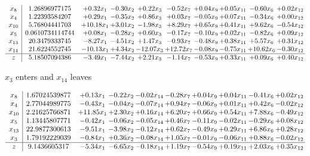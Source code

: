 \documentclass[9pt]{article}
\begin{document}
 \[\begin{array}{c| c c@{\hskip 2pt} c@{\hskip 2pt} c@{\hskip 2pt} c@{\hskip 2pt} c@{\hskip 2pt} c@{\hskip 2pt} c@{\hskip 2pt} c@{\hskip 2pt} }
 x_{8}   &  1.26896977175 & +  0.32 x_{1} & -0.30 x_{2} & +  0.22 x_{3} & -0.52 x_{7} & +  0.04 x_{9} & +  0.05 x_{11} & -0.60 x_{6} & +  0.02 x_{12}\\
 x_{4}   &  1.22393584207 & +  0.29 x_{1} & -0.35 x_{2} & +  0.86 x_{3} & +  0.03 x_{7} & -0.05 x_{9} & +  0.07 x_{11} & -0.34 x_{6} & +  0.00 x_{12}\\
 x_{10}   &  5.76804441703 & + 10.18 x_{1} & +  3.01 x_{2} & -1.98 x_{3} & +  8.29 x_{7} & +  0.65 x_{9} & +  0.41 x_{11} & +  9.62 x_{6} & -0.54 x_{12}\\
 x_{5}   &  0.0610734114744 & +  0.08 x_{1} & -0.28 x_{2} & +  0.60 x_{3} & -0.17 x_{7} & -0.10 x_{9} & +  0.02 x_{11} & -0.82 x_{6} & +  0.09 x_{12}\\
 x_{13}   &  20.3479333745 & -8.27 x_{1} & -4.51 x_{2} & +  1.47 x_{3} & -0.93 x_{7} & -0.48 x_{9} & +  0.38 x_{11} & +  5.57 x_{6} & +  0.31 x_{12}\\
 x_{14}   &  21.6224552745 & -10.13 x_{1} & +  4.34 x_{2} & -12.07 x_{3} & + 12.72 x_{7} & -0.08 x_{9} & -0.75 x_{11} & + 10.62 x_{6} & -0.30 x_{12}\\
\hline
z    &  5.18507094386 & -3.49 x_{1} & -7.44 x_{2} & +  2.21 x_{3} & -1.14 x_{7} & -0.53 x_{9} & +  0.33 x_{11} & +  0.09 x_{6} & +  0.40 x_{12}\\
\end{array}\]


 $ x_{3} $ enters and $ x_{14} $ leaves 

 \[\begin{array}{c| c c@{\hskip 2pt} c@{\hskip 2pt} c@{\hskip 2pt} c@{\hskip 2pt} c@{\hskip 2pt} c@{\hskip 2pt} c@{\hskip 2pt} c@{\hskip 2pt} }
 x_{8}   &  1.67024539877 & +  0.13 x_{1} & -0.22 x_{2} & -0.02 x_{14} & -0.28 x_{7} & +  0.04 x_{9} & +  0.04 x_{11} & -0.41 x_{6} & +  0.02 x_{12}\\
 x_{4}   &  2.77044989775 & -0.43 x_{1} & -0.04 x_{2} & -0.07 x_{14} & +  0.94 x_{7} & -0.06 x_{9} & +  0.01 x_{11} & +  0.42 x_{6} & -0.02 x_{12}\\
 x_{10}   &  2.21625766871 & + 11.85 x_{1} & +  2.30 x_{2} & +  0.16 x_{14} & +  6.20 x_{7} & +  0.66 x_{9} & +  0.54 x_{11} & +  7.88 x_{6} & -0.49 x_{12}\\
 x_{5}   &  1.13445807771 & -0.42 x_{1} & -0.06 x_{2} & -0.05 x_{14} & +  0.46 x_{7} & -0.11 x_{9} & -0.02 x_{11} & -0.29 x_{6} & +  0.08 x_{12}\\
 x_{13}   &  22.9877300613 & -9.51 x_{1} & -3.98 x_{2} & -0.12 x_{14} & +  0.62 x_{7} & -0.49 x_{9} & +  0.29 x_{11} & +  6.86 x_{6} & +  0.28 x_{12}\\
 x_{3}   &  1.79192229039 & -0.84 x_{1} & +  0.36 x_{2} & -0.08 x_{14} & +  1.05 x_{7} & -0.01 x_{9} & -0.06 x_{11} & +  0.88 x_{6} & -0.02 x_{12}\\
\hline
z    &  9.1436605317 & -5.34 x_{1} & -6.65 x_{2} & -0.18 x_{14} & +  1.19 x_{7} & -0.54 x_{9} & +  0.19 x_{11} & +  2.03 x_{6} & +  0.35 x_{12}\\
\end{array}\]
\end{document}
